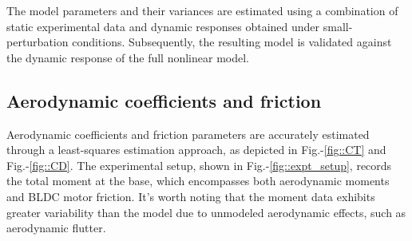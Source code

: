 The model parameters and their variances are estimated using a combination of static experimental data and dynamic responses obtained under small-perturbation conditions. Subsequently, the resulting model is validated against the dynamic response of the full nonlinear model.

\subsection{Aerodynamic coefficients and friction}
Aerodynamic coefficients and friction parameters are accurately estimated
through a least-squares estimation approach, as depicted in Fig.-\ref{fig::CT}
and Fig.-\ref{fig::CD}. The experimental setup, shown in
Fig.-\ref{fig::expt_setup}, records the total moment at the base, which
encompasses both aerodynamic moments and BLDC motor friction. It's worth noting
that the moment data exhibits greater variability than the model due to
unmodeled aerodynamic effects, such as aerodynamic flutter.


